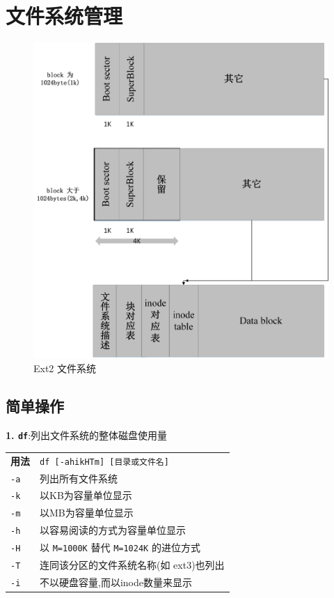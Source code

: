 \section{文件系统管理}
\begin{figure}[h]
\centering
\includegraphics[width=\textwidth]{pic/fileSystem.jpg}
\caption{Ext2 文件系统}
\end{figure}

\subsection{简单操作}
\par
\textbf{1. \texttt{df}}:列出文件系统的整体磁盘使用量
{\kaishu
\begin{longtable}{l@{ : }p{}}\hline\hline

    \textbf{用法} & \verb"df [-ahikHTm] [目录或文件名]"
    \\

    \texttt{-a} & 列出所有文件系统\\

    \texttt{-k} & 以KB为容量单位显示\\

    \texttt{-m} & 以MB为容量单位显示\\

    \texttt{-h} & 以容易阅读的方式为容量单位显示\\

    \texttt{-H} & 以 \texttt{M=1000K} 替代 \texttt{M=1024K} 的进位方式\\

    \texttt{-T} & 连同该分区的文件系统名称(如 ext3)也列出\\

    \texttt{-i} & 不以硬盘容量,而以inode数量来显示 \\

    \hline
\end{longtable}}

